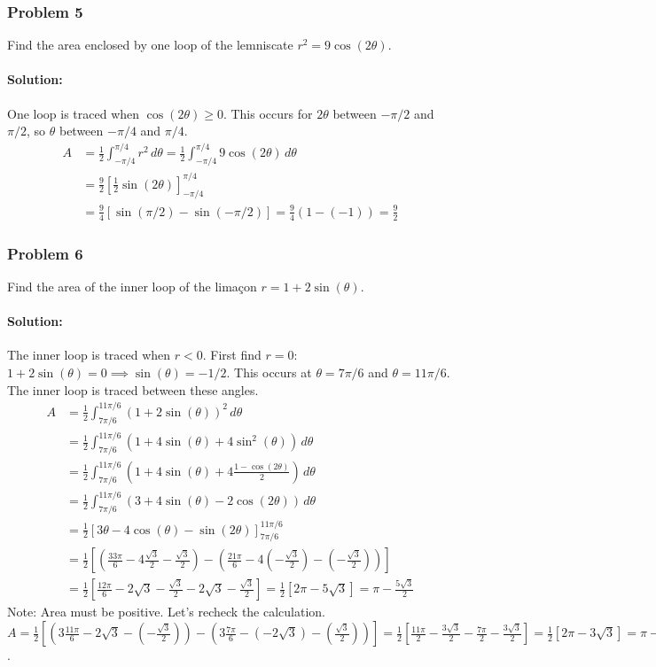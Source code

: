 \documentclass{article}
\begin{document}
\subsubsection*{Problem 5}
Find the area enclosed by one loop of the lemniscate $r^2 = 9\cos(2\theta)$.
\paragraph{Solution:}
One loop is traced when $\cos(2\theta) \ge 0$. This occurs for $2\theta$ between $-\pi/2$ and $\pi/2$, so $\theta$ between $-\pi/4$ and $\pi/4$.
\begin{align*} A &= \frac{1}{2} \int_{-\pi/4}^{\pi/4} r^2 \,d\theta = \frac{1}{2} \int_{-\pi/4}^{\pi/4} 9\cos(2\theta) \,d\theta \\ &= \frac{9}{2} \left[\frac{1}{2}\sin(2\theta)\right]_{-\pi/4}^{\pi/4} \\ &= \frac{9}{4} \left[\sin(\pi/2) - \sin(-\pi/2)\right] = \frac{9}{4} (1 - (-1)) = \frac{9}{2} \end{align*}

\subsubsection*{Problem 6}
Find the area of the inner loop of the limaçon $r = 1 + 2\sin(\theta)$.
\paragraph{Solution:}
The inner loop is traced when $r < 0$. First find $r=0$: $1+2\sin(\theta)=0 \implies \sin(\theta)=-1/2$.
This occurs at $\theta = 7\pi/6$ and $\theta = 11\pi/6$. The inner loop is traced between these angles.
\begin{align*} A &= \frac{1}{2} \int_{7\pi/6}^{11\pi/6} (1 + 2\sin(\theta))^2 \,d\theta \\ &= \frac{1}{2} \int_{7\pi/6}^{11\pi/6} (1 + 4\sin(\theta) + 4\sin^2(\theta)) \,d\theta \\ &= \frac{1}{2} \int_{7\pi/6}^{11\pi/6} \left(1 + 4\sin(\theta) + 4\frac{1-\cos(2\theta)}{2}\right) \,d\theta \\ &= \frac{1}{2} \int_{7\pi/6}^{11\pi/6} (3 + 4\sin(\theta) - 2\cos(2\theta)) \,d\theta \\ &= \frac{1}{2} [3\theta - 4\cos(\theta) - \sin(2\theta)]_{7\pi/6}^{11\pi/6} \\ &= \frac{1}{2} \left[\left(\frac{33\pi}{6} - 4\frac{\sqrt{3}}{2} - \frac{\sqrt{3}}{2}\right) - \left(\frac{21\pi}{6} - 4(-\frac{\sqrt{3}}{2}) - (-\frac{\sqrt{3}}{2})\right)\right] \\ &= \frac{1}{2} \left[\frac{12\pi}{6} - 2\sqrt{3} - \frac{\sqrt{3}}{2} - 2\sqrt{3} - \frac{\sqrt{3}}{2}\right] = \frac{1}{2} [2\pi - 5\sqrt{3}] = \pi - \frac{5\sqrt{3}}{2} \end{align*}
Note: Area must be positive. Let's recheck the calculation.
$A = \frac{1}{2} [(3\frac{11\pi}{6} - 2\sqrt{3} - (-\frac{\sqrt{3}}{2})) - (3\frac{7\pi}{6} - (-2\sqrt{3}) - (\frac{\sqrt{3}}{2}))] = \frac{1}{2} [\frac{11\pi}{2} - \frac{3\sqrt{3}}{2} - \frac{7\pi}{2} - \frac{3\sqrt{3}}{2}] = \frac{1}{2}[2\pi - 3\sqrt{3}] = \pi - \frac{3\sqrt{3}}{2}$.
\end{document}
